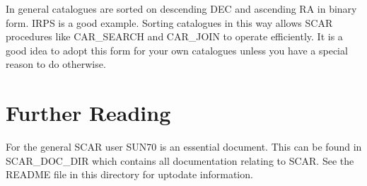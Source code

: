 In general catalogues are sorted on descending DEC and ascending RA in binary
form. IRPS is a good example. Sorting catalogues in this way allows SCAR
procedures like CAR\_SEARCH and CAR\_JOIN to operate efficiently. It is a good
idea to adopt this form for your own catalogues unless you have a special
reason to do otherwise.


\section{Further Reading}

For the general SCAR user SUN70 is an essential document. This can be found in
SCAR\_DOC\_DIR which contains all documentation relating to SCAR. See the
README file in this directory for uptodate information.


